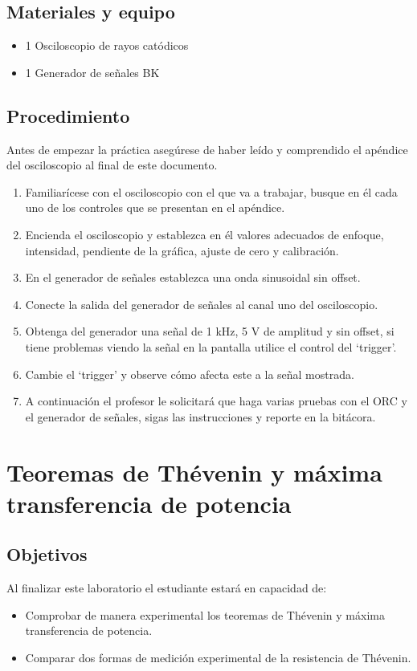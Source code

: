 \documentclass{report}
\newcommand{\obj}{Objetivos}
\newcommand{\mat}{Materiales y equipo}
\newcommand{\pro}{Procedimiento}
\newcommand{\capacidad}{Al finalizar este laboratorio el estudiante estará en capacidad de:}
\begin{document}
\section{\mat}
\begin{itemize}
\item 1 Osciloscopio de rayos catódicos
\item 1 Generador de señales BK
\end{itemize}

\section{\pro}
Antes de empezar la práctica asegúrese de haber leído y comprendido el apéndice
del osciloscopio al final de este documento.

\begin{enumerate}
\item Familiarícese con el osciloscopio con el que va a trabajar, busque en él cada
uno de los controles que se presentan en el apéndice.
\item Encienda el osciloscopio y establezca en él valores adecuados de enfoque,
intensidad, pendiente de la gráfica, ajuste de cero y calibración.
\item En el generador de señales establezca una onda sinusoidal sin offset.
\item Conecte la salida del generador de señales al canal uno del osciloscopio.
\item Obtenga del generador una señal de 1 kHz, 5 V de amplitud y sin offset, si
tiene problemas viendo la señal en la pantalla utilice el control del ‘trigger’.
\item Cambie el ‘trigger’ y observe cómo afecta este a la señal mostrada.
\item A continuación el profesor le solicitará que haga varias pruebas con el ORC
y el generador de señales, sigas las instrucciones y reporte en la bitácora.
\end{enumerate}

\chapter{Teoremas de Thévenin y máxima transferencia de potencia}

\section{\obj}
\capacidad
\begin{itemize}
\item Comprobar de manera experimental los teoremas de Thévenin y máxima
transferencia de potencia.
\item Comparar dos formas de medición experimental de la resistencia de
Thévenin.
\end{itemize}
\end{document}
